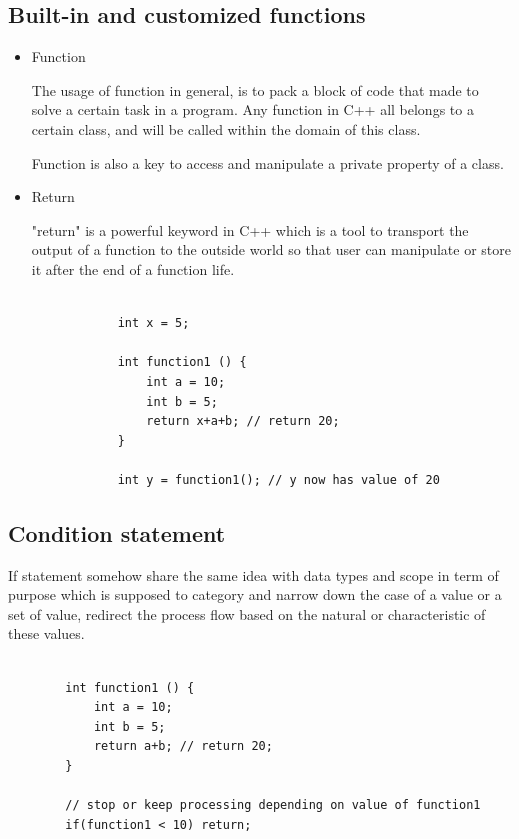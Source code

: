 \documentclass[english]{article}
\begin{document}
{\begin{itemize}
	\end{itemize}
\newpage


\subsection{Built-in and customized functions}
	\begin{itemize}
		\item Function
		
		The usage of function in general, is to pack a block of code that made to solve a certain task in a program. Any function in C++ all belongs to a certain class, and will be called within the domain of this class.
		
		Function is also a key to access and manipulate a private property of a class.
		
		\item Return
		
		"return" is a powerful keyword in C++ which is a tool to transport the output of a function to the outside world so that user can manipulate or store it after the end of a function life.
		 
		\lstset{language=C++}
		\begin{lstlisting}
		
			int x = 5;
			
			int function1 () {
				int a = 10;
				int b = 5;
				return x+a+b; // return 20;
			}
			
			int y = function1(); // y now has value of 20
		\end{lstlisting}
	\end{itemize}



\subsection{Condition statement}

	If statement somehow share the same idea with data types and scope in term of purpose which is supposed to category and narrow down the case of a value or a set of value, redirect the process flow based on the natural or characteristic of these values. 
	
	\lstset{language=C++}
	\begin{lstlisting}
		
		int function1 () {
			int a = 10;
			int b = 5;
			return a+b; // return 20;
		}
		
		// stop or keep processing depending on value of function1
		if(function1 < 10) return;  
	\end{lstlisting}


}
\end{document}
